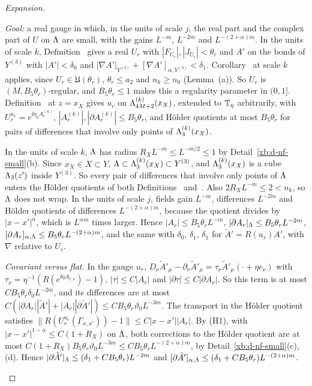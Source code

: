 \begin{proof}[Expansion]
\begin{step}
\emph{Goal:} a real gauge in which, in the units of scale $j$, the real part and the complex part of $U$ on $\Lambda$ are small, with the gains $L^{-m}$, $L^{-2m}$ and $L^{-(2+\alpha)m}$.
In the units of scale $k$, Definition~ gives a real $U_r$ with $|F_{U_r}|,|J_{U_r}|<\theta_r$ and $A'$ on the bonds of $Y^{(3)}$ with $|A'|<\delta_0$ and $|\nabla A'|_{Y^{(3)}}+[\nabla A']_{\alpha,Y^{(3)}}<\delta_1$. Corollary~ at scale $k$ applies, since $U_r\in\mathfrak U(\theta_r)$, $\theta_r\le a_2$ and $n_k\ge n_0$ (Lemma~(a)). So $U_r$ is $(M,B_5\theta_r)$-regular, and $B_5\theta_r\le1$ makes this a regularity parameter in $(0,1]$. Definition~ at $z=x_X$ gives $u_r$ on $\Lambda^{(k)}_{4M+2}(x_X)$, extended to $\mathbb T_\eta$ arbitrarily, with $U_r^{u_r}=e^{\ii\eta_kA^{(k)}_r}$, $|A^{(k)}_r|,|\partial A^{(k)}_r|\le B_5\theta_r$, and H\"older quotients at most $B_5\theta_r$ for pairs of differences that involve only points of $\Lambda^{(k)}_3(x_X)$.

In the units of scale $k$, $\Lambda$ has radius $R_XL^{-m}\le L^{-m/2}\le1$ by Detail~\ref{xb:d-nf-small}(b). Since $x_X\in X\subset Y$, $\Lambda\subset\Lambda^{(k)}_3(x_X)\subset Y^{(3)}$, and $\Lambda^{(k)}_3(x_X)$ is a cube $\Lambda_3(z')$ inside $Y^{(3)}$. So every pair of differences that involve only points of $\Lambda$ enters the H\"older quotients of both Definitions~ and~. Also $2R_XL^{-m}\le2<n_k$, so $\Lambda$ does not wrap. In the units of scale $j$, fields gain $L^{-m}$, differences $L^{-2m}$ and H\"older quotients of differences $L^{-(2+\alpha)m}$, because the quotient divides by $|x-x'|^\alpha$, which is $L^{\alpha m}$ times larger. Hence $|A_r|\le B_5\theta_rL^{-m}$, $|\partial A_r|_\Lambda\le B_5\theta_rL^{-2m}$, $[\partial A_r]_{\alpha,\Lambda}\le B_5\theta_rL^{-(2+\alpha)m}$, and the same with $\delta_0$, $\delta_1$, $\delta_1$ for $\tilde A'=R(u_r)A'$, with $\nabla$ relative to $U_r$.

\emph{Covariant versus flat.} In the gauge $u_r$, $D_\nu\tilde A'_\mu-\partial_\nu\tilde A'_\mu=\tau_\nu\tilde A'_\mu(\cdot+\eta e_\nu)$ with $\tau_\nu=\eta^{-1}(R(e^{\ii\eta A_{r,\nu}})-1)$, $|\tau|\le C|A_r|$ and $|\partial\tau|\le C|\partial A_r|$. So this term is at most $CB_5\theta_r\delta_0L^{-2m}$, and its differences are at most $C(|\partial A_r||\tilde A'|+|A_r||\partial\tilde A'|)\le CB_5\theta_r\vartheta_0L^{-3m}$. The transport in the H\"older quotient satisfies $\|R(U_r^{u_r}(\Gamma_{x,x'}))-1\|\le C|x-x'||A_r|$. By (H1), with $|x-x'|^{1-\alpha}\le C(1+R_X)$ on $\Lambda$, both corrections to the H\"older quotient are at most $C(1+R_X)B_5\theta_r\vartheta_0L^{-3m}\le CB_5\theta_rL^{-(2+\alpha)m}$, by Detail~\ref{xb:d-nf-small}(c),(d). Hence $|\partial\tilde A'|_\Lambda\le(\delta_1+CB_5\theta_r)L^{-2m}$ and $[\partial\tilde A']_{\alpha,\Lambda}\le(\delta_1+CB_5\theta_r)L^{-(2+\alpha)m}$.
\end{step}


\end{proof}

